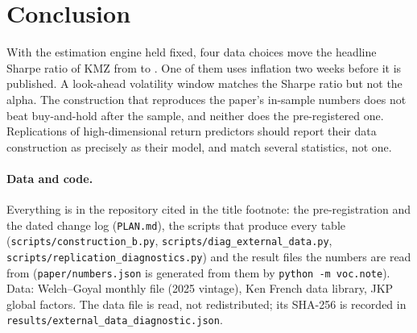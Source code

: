 \documentclass[11pt]{article}
\begin{document}
\section{Conclusion}

With the estimation engine held fixed, four data choices move the headline Sharpe ratio of KMZ from \nDecASR{} to
\nDecFourSR. One of them uses inflation two weeks before it is published. A look-ahead volatility window matches
the Sharpe ratio but not the alpha. The construction that reproduces the paper's in-sample numbers does not
beat buy-and-hold after the sample, and neither does the pre-registered one. Replications of high-dimensional return predictors
should report their data construction as precisely as their model, and match several statistics, not one.

{\sloppy\paragraph{Data and code.} Everything is in the repository cited in the title footnote: the pre-registration
and the dated change log (\texttt{PLAN.md}), the scripts that produce every table
(\texttt{scripts/construction\_b.py}, \texttt{scripts/diag\_external\_data.py},
\texttt{scripts/replication\_diagnostics.py}) and the result files the numbers are read from
(\texttt{paper/numbers.json} is generated from them by \texttt{python -m voc.note}). Data: Welch--Goyal monthly
file (2025 vintage), Ken French data library, JKP global factors. The \citet{rrikrv} data file is read, not
redistributed; its SHA-256 is recorded in \texttt{results/external\_data\_diagnostic.json}.\par}



\end{document}
